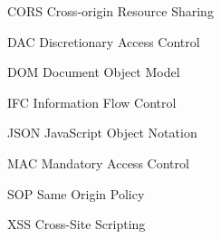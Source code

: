 %
%

%
%




%
%
%

{\SingleSpacing
{}
\listoffigures*
\cleardoublepage
}

{\SingleSpacing
	\lstlistoflistings*
	\cleardoublepage
}



%
\begin{siglas}
  \item[CORS] Cross-origin Resource Sharing
  \item[DAC] Discretionary Access Control
  \item[DOM] Document Object Model
  \item[IFC] Information Flow Control
  \item[JSON] JavaScript Object Notation
  \item[MAC] Mandatory Access Control
  \item[SOP] Same Origin Policy
  \item[XSS] Cross-Site Scripting
\end{siglas}

